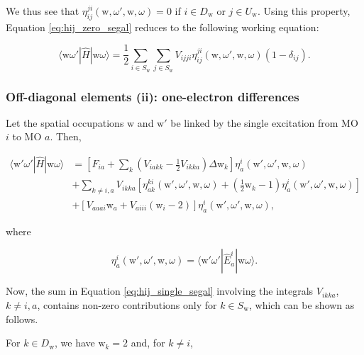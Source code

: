 \documentclass[12pt,a4paper]{report}
\begin{document}
\noindent
We thus see that $\eta_{ij}^{ji}(\text{w},\omega',\text{w},\omega)=0$
if $i \in D_{\text{w}}$ or $j \in U_{\text{w}}$. Using this property,
Equation \ref{eq:hij_zero_segal} reduces to the following working
equation:

\begin{equation}\label{eq:hij_zero_working}
  \langle \text{w} \omega' | \hat{H} | \text{w} \omega \rangle =
  \frac{1}{2} \sum_{i \in S_{\text{w}}} \sum_{j \in S_{\text{w}}}
  V_{ijji} \eta_{ij}^{ji}(\text{w},\omega',\text{w},\omega)
  (1-\delta_{ij}).
\end{equation}

\subsubsection{Off-diagonal elements (ii): one-electron differences}
Let the spatial occupations $\text{w}$ and $\text{w}'$ be linked by
the single excitation from MO $i$ to MO $a$. Then,

\begin{equation}\label{eq:hij_single_segal}
  \begin{aligned}
    \langle \text{w}' \omega' | \hat{H} | \text{w} \omega \rangle &=
    \left[ F_{ia} + \sum_{k} \left( V_{iakk} - \frac{1}{2} V_{ikka}
      \right) \Delta \text{w}_{k} \right]
    \eta_{a}^{i}(\text{w}',\omega',\text{w},\omega) \\
    &+ \sum_{k \ne i,a} V_{ikka} \left[
      \eta_{ak}^{ki}(\text{w}',\omega',\text{w},\omega) + \left(
      \frac{1}{2}\text{w}_{k} -1 \right)
      \eta_{a}^{i}(\text{w}',\omega',\text{w},\omega) \right] \\
    &+ \left[ V_{aaai} \text{w}_{a} + V_{aiii} \left( \text{w}_{i} -2
      \right) \right] \eta_{a}^{i}(\text{w}',\omega',\text{w},\omega),
  \end{aligned}
\end{equation}

\noindent
where

\begin{equation}
  \eta_{a}^{i}(\text{w}',\omega',\text{w},\omega) = \langle \text{w}'
  \omega' | \hat{E}_{a}^{i} | \text{w} \omega \rangle.
\end{equation}

\noindent
Now, the sum in Equation \ref{eq:hij_single_segal} involving the
integrals $V_{ikka}$, $k \ne i,a$, contains non-zero contributions
only for $k \in S_{\text{w}}$, which can be shown as follows.

For $k \in D_{\text{w}}$, we have $\text{w}_{k}=2$ and, for $k \ne i$,
\end{document}
